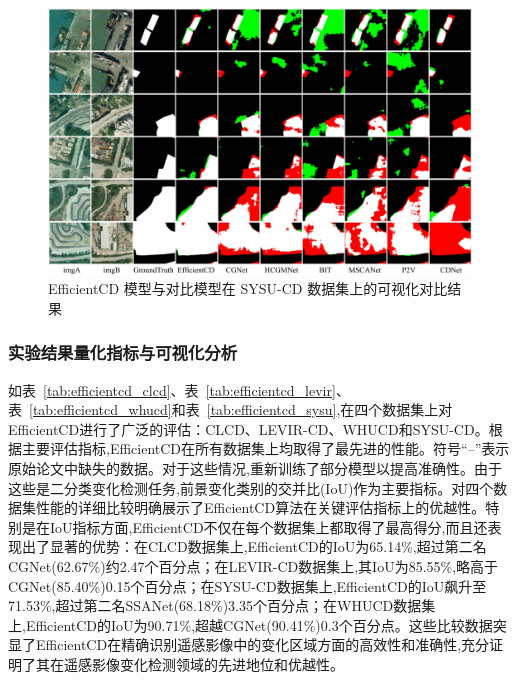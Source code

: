 \begin{figure}[!htbp]
  \centering
  \includegraphics[width=\textwidth]{paper_figures/基于双时相遥感影像特征交互的变化检测算法研究/EfficientCD/efficientcd_sysu.png}
  \caption{EfficientCD 模型与对比模型在 SYSU-CD 数据集上的可视化对比结果}
  \label{fig:efficientcd_sysu}
\end{figure}


\subsubsection{实验结果量化指标与可视化分析}

如表~\ref{tab:efficientcd_clcd}、表~\ref{tab:efficientcd_levir}、表~\ref{tab:efficientcd_whucd}和表~\ref{tab:efficientcd_sysu},在四个数据集上对EfficientCD进行了广泛的评估：CLCD、LEVIR-CD、WHUCD和SYSU-CD。根据主要评估指标,EfficientCD在所有数据集上均取得了最先进的性能。符号``--''表示原始论文中缺失的数据。对于这些情况,重新训练了部分模型以提高准确性。由于这些是二分类变化检测任务,前景变化类别的交并比(IoU)作为主要指标。对四个数据集性能的详细比较明确展示了EfficientCD算法在关键评估指标上的优越性。特别是在IoU指标方面,EfficientCD不仅在每个数据集上都取得了最高得分,而且还表现出了显著的优势：在CLCD数据集上,EfficientCD的IoU为65.14\%,超过第二名CGNet(62.67\%)约2.47个百分点；在LEVIR-CD数据集上,其IoU为85.55\%,略高于CGNet(85.40\%)0.15个百分点；在SYSU-CD数据集上,EfficientCD的IoU飙升至71.53\%,超过第二名SSANet(68.18\%)3.35个百分点；在WHUCD数据集上,EfficientCD的IoU为90.71\%,超越CGNet(90.41\%)0.3个百分点。这些比较数据突显了EfficientCD在精确识别遥感影像中的变化区域方面的高效性和准确性,充分证明了其在遥感影像变化检测领域的先进地位和优越性。

